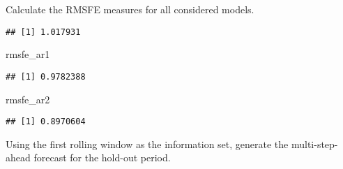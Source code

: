 \documentclass[
  oneside]{book}
\newenvironment{Shaded}{\begin{snugshade}}{\end{snugshade}}
\newcommand{\AttributeTok}[1]{\textcolor[rgb]{0.77,0.63,0.00}{#1}}
\newcommand{\DecValTok}[1]{\textcolor[rgb]{0.00,0.00,0.81}{#1}}
\newcommand{\FunctionTok}[1]{\textcolor[rgb]{0.00,0.00,0.00}{#1}}
\newcommand{\NormalTok}[1]{#1}
\newcommand{\OtherTok}[1]{\textcolor[rgb]{0.56,0.35,0.01}{#1}}
\newcommand{\SpecialCharTok}[1]{\textcolor[rgb]{0.00,0.00,0.00}{#1}}
\newcommand{\StringTok}[1]{\textcolor[rgb]{0.31,0.60,0.02}{#1}}
\begin{document}
Calculate the RMSFE measures for all considered models.

\begin{Shaded}
\end{Shaded}

\begin{verbatim}
## [1] 1.017931
\end{verbatim}

\begin{Shaded}
\begin{Highlighting}[]
\NormalTok{rmsfe\_ar1}
\end{Highlighting}
\end{Shaded}

\begin{verbatim}
## [1] 0.9782388
\end{verbatim}

\begin{Shaded}
\begin{Highlighting}[]
\NormalTok{rmsfe\_ar2}
\end{Highlighting}
\end{Shaded}

\begin{verbatim}
## [1] 0.8970604
\end{verbatim}

Using the first rolling window as the information set, generate the multi-step-ahead forecast for the hold-out period.
\end{document}
